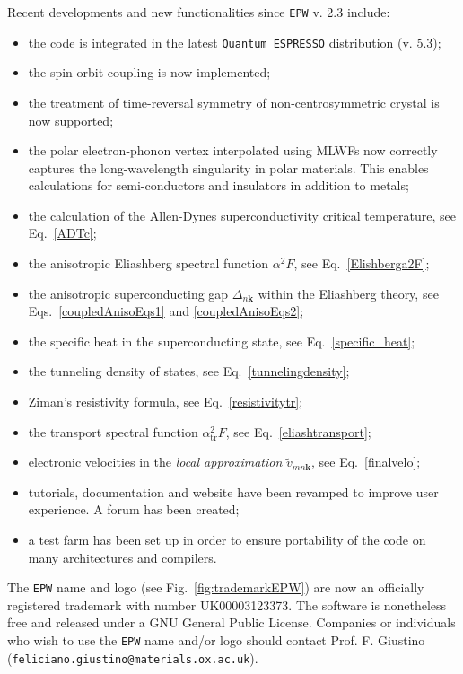 \documentclass[final,3p,times,twocolumn]{elsarticle}
\begin{document}
Recent developments and new functionalities since \texttt{EPW} v. 2.3 include:
\begin{itemize}	
	\item the code is integrated in the latest \texttt{Quantum ESPRESSO} distribution (v. 5.3);
	\item the spin-orbit coupling is now implemented;
	\item the treatment of time-reversal symmetry of non-centrosymmetric crystal is now supported;
	\item the polar electron-phonon vertex interpolated using MLWFs now correctly captures the long-wavelength singularity in polar materials. This enables calculations for semi-conductors and insulators in addition to metals;
\end{itemize}
\begin{itemize}
	\item the calculation of the Allen-Dynes superconductivity critical temperature, see Eq.~\eqref{ADTc};
	\item the anisotropic Eliashberg spectral function $\alpha^2F$, see Eq.~\eqref{Elishberga2F};	
	\item the anisotropic superconducting gap $\Delta_{n\mathbf{k}}$ within the Eliashberg theory, see Eqs.~\eqref{coupledAnisoEqs1} and \eqref{coupledAnisoEqs2};
	\item the specific heat in the superconducting state, see Eq.~\eqref{specific_heat};
	\item the tunneling density of states, see Eq.~\eqref{tunnelingdensity};
	\item Ziman's resistivity formula, see Eq.~\eqref{resistivitytr};			
	\item the transport spectral function $\alpha_{\text{tr}}^2 F$, see Eq.~\eqref{eliashtransport};	
	\item electronic velocities in the \textit{local approximation} $\tilde{v}_{mn\mathbf{k}}$, see Eq.~\eqref{finalvelo};
	\item tutorials, documentation and website have been revamped to improve user experience. A forum has been created;
	\item a test farm has been set up in order to ensure portability of the code on many architectures and compilers.	
\end{itemize}   


The \texttt{EPW} name and logo (see Fig.~\ref{fig:trademarkEPW}) are now an officially registered trademark with number UK00003123373. The software is nonetheless free and released under a GNU General Public License. Companies or individuals who wish to use the \texttt{EPW} name and/or logo should contact Prof. F. Giustino (\texttt{feliciano.giustino@materials.ox.ac.uk}).
\end{document}
